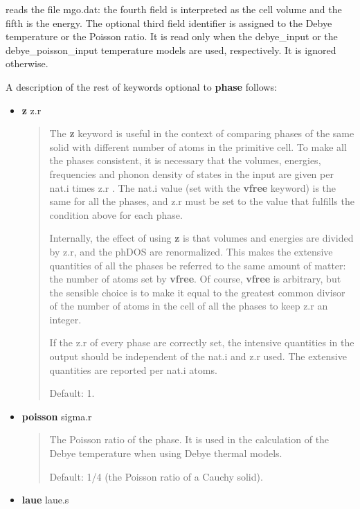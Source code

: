 \documentclass[a4paper]{article}
\begin{document}
reads the file mgo.dat: the fourth field is interpreted as the cell
volume and the fifth is the energy. The optional third field
identifier is assigned to the Debye temperature or the Poisson
ratio. It is read only when the debye\_input or the debye\_poisson\_input
temperature models are used, respectively. It is ignored otherwise.

A description of the rest of keywords optional to \textbf{phase} follows:

\begin{itemize}
\item \textbf{z} z.r

\begin{quote}
The \textbf{z} keyword is useful in the context of comparing phases of
the same solid with different number of atoms in the primitive
cell. To make all the phases consistent, it is necessary that the
volumes, energies, frequencies and phonon density of states in the
input are given per nat.i times z.r . The nat.i value (set with the
\textbf{vfree} keyword) is the same for all the phases, and z.r must be
set to the value that fulfills the condition above for each phase.

Internally, the effect of using \textbf{z} is that volumes and energies
are divided by z.r, and the phDOS are renormalized. This makes the
extensive quantities of all the phases be referred to the same
amount of matter: the number of atoms set by \textbf{vfree}. Of course,
\textbf{vfree} is arbitrary, but the sensible choice is to make it equal
to the greatest common divisor of the number of atoms in the cell of
all the phases to keep z.r an integer.

If the z.r of every phase are correctly set, the intensive
quantities in the output should be independent of the nat.i and z.r
used. The extensive quantities are reported per nat.i atoms.

Default: 1.
\end{quote}

\item \textbf{poisson} sigma.r

\begin{quote}
The Poisson ratio of the phase. It is used in the calculation of the
Debye temperature when using Debye thermal models.

Default: 1/4 (the Poisson ratio of a Cauchy solid).
\end{quote}

\item \textbf{laue} laue.s


\end{itemize}
\end{document}
